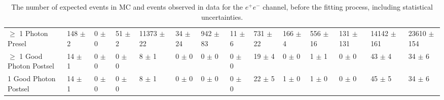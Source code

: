\begin{table}
{\begin{tabular}{|l|l|l|l|l|l|l|l|l|l|l|l|l|l|}
$\geq$ 1 Photon Presel & 148 $\pm$ 2 \ & 0 $\pm$ 0 \ & 51 $\pm$ 2 \ & 11373 $\pm$ 22 \ & 34 $\pm$ 24 \ & 942 $\pm$ 83 \ & 11 $\pm$ 6 \ & 731 $\pm$ 22 \ & 166 $\pm$ 4 \ & 556 $\pm$ 16 \ & 131 $\pm$ 131\ & 14142 $\pm$ 161 \ & 23610 $\pm$ 154 \\
$\geq$ 1 Good Photon Postsel & 14 $\pm$ 1 \ & 0 $\pm$ 0 \ & 0 $\pm$ 0 \ & 8 $\pm$ 1 \ & 0 $\pm$ 0 \ & 0 $\pm$ 0 \ & 0 $\pm$ 0 \ & 19 $\pm$ 4 \ & 0 $\pm$ 0 \ & 1 $\pm$ 1 \ & 0 $\pm$ 0\ & 43 $\pm$ 4 \ & 34 $\pm$ 6 \\
1 Good Photon Postsel & 14 $\pm$ 1 \ & 0 $\pm$ 0 \ & 0 $\pm$ 0 \ & 8 $\pm$ 1 \ & 0 $\pm$ 0 \ & 0 $\pm$ 0 \ & 0 $\pm$ 0 \ & 22 $\pm$ 5 \ & 1 $\pm$ 0 \ & 1 $\pm$ 0 \ & 0 $\pm$ 0\ & 45 $\pm$ 5 \ & 34 $\pm$ 6 \\
\hline
\end{tabular}
}
\caption{The number of expected events in MC and events observed in data for the $e^+e^-$ channel, before the fitting process, including statistical uncertainties.}
\label{tab-cutflowEE}
\end{table}

